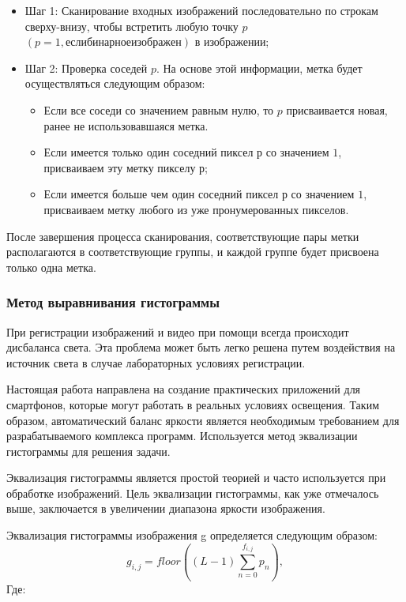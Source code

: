 \begin{itemize}
	\item Шаг 1: Сканирование входных изображений последовательно по строкам сверху-внизу, чтобы встретить любую точку $p$ $\left(p=1,если бинарное изображен\right)$ в изображении;
	\item Шаг 2: Проверка соседей $p$. На основе этой информации, метка будет осуществляться следующим образом:
	
	\begin{itemize}
		\item Если все соседи со значением равным нулю, то $p$ присваивается новая, ранее не использовавшаяся метка.
		\item Если имеется только один соседний пиксел $р$ со значением $1$, присваиваем эту метку пикселу $р$;
		\item Если имеется больше чем один соседний пиксел $р$ со значением $1$, присваиваем метку любого из уже пронумерованных пикселов.
	\end{itemize}
	
\end{itemize}
После завершения процесса сканирования, соответствующие пары метки располагаются в соответствующие группы, и каждой группе будет присвоена только одна метка.
\subsubsection{Метод выравнивания гистограммы}
При регистрации изображений и видео при помощи всегда происходит дисбаланса света. Эта проблема может быть легко решена путем воздействия на источник света в случае лабораторных условиях регистрации.

Настоящая работа направлена на создание практических приложений для смартфонов, которые могут работать в реальных условиях освещения. Таким образом, автоматический баланс яркости является необходимым требованием для разрабатываемого комплекса программ. Используется метод эквализации гистограммы для решения задачи.

Эквализация гистограммы является простой теорией и часто используется при обработке изображений. Цель эквализации гистограммы, как уже отмечалось выше, заключается в увеличении диапазона яркости изображения.

Эквализация гистограммы изображения g определяется следующим образом:
\begin{equation}\label{eq6}
g_{i,j}=floor\left(\left(L-1\right)\sum^{f_{i,j}}_{n=0}p_n\right),
\end{equation}
Где:

